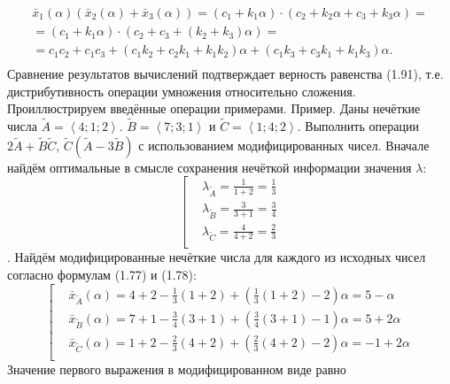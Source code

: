\[\begin{matrix}
  {{{\bar{x}}}_{1}}\left( \alpha  \right)\left( {{{\bar{x}}}_{2}}\left( \alpha  \right)+{{{\bar{x}}}_{3}}\left( \alpha  \right) \right)=({{c}_{1}}+{{k}_{1}}\alpha )\cdot ({{c}_{2}}+{{k}_{2}}\alpha +{{c}_{3}}+{{k}_{3}}\alpha )= \\ 
  =({{c}_{1}}+{{k}_{1}}\alpha )\cdot ({{c}_{2}}+{{c}_{3}}+({{k}_{2}}+{{k}_{3}})\alpha )= \\ 
  ={{c}_{1}}{{c}_{2}}+{{c}_{1}}{{c}_{3}}+({{c}_{1}}{{k}_{2}}+{{c}_{2}}{{k}_{1}}+{{k}_{1}}{{k}_{2}})\alpha +({{c}_{1}}{{k}_{3}}+{{c}_{3}}{{k}_{1}}+{{k}_{1}}{{k}_{3}})\alpha . \\ 
\end{matrix}\] 
Сравнение результатов вычислений подтверждает верность равенства (1.91), т.е. дистрибутивность операции умножения относительно сложения.
Проиллюстрируем введённые операции примерами.
Пример. Даны нечёткие числа $\tilde{A}=\left\langle 4;1;2 \right\rangle $. $\tilde{B}=\left\langle 7;3;1 \right\rangle $ и $\tilde{C}=\left\langle 1;4;2 \right\rangle $. Выполнить операции $2\tilde{A}+\tilde{B}\tilde{C}$, $\tilde{C}\left( \tilde{A}-3\tilde{B} \right)$ с использованием модифицированных чисел.
Вначале найдём оптимальные в смысле сохранения нечёткой информации значения $\lambda$:
	\[\left[ \begin{aligned}
  & {{\lambda }_{{\tilde{A}}}}=\frac{1}{1+2}=\frac{1}{3} \\ 
 & {{\lambda }_{{\tilde{B}}}}=\frac{3}{3+1}=\frac{3}{4} \\ 
 & {{\lambda }_{{\tilde{C}}}}=\frac{4}{4+2}=\frac{2}{3} \\ 
\end{aligned} \right.\].
Найдём модифицированные нечёткие числа для каждого из исходных чисел согласно формулам (1.77) и (1.78):
	\[\left[ \begin{aligned}
  & {{{\bar{x}}}_{{\tilde{A}}}}\left( \alpha  \right)=4+2-\frac{1}{3}\left( 1+2 \right)+\left( \frac{1}{3}\left( 1+2 \right)-2 \right)\alpha =5-\alpha  \\ 
 & {{{\bar{x}}}_{{\tilde{B}}}}\left( \alpha  \right)=7+1-\frac{3}{4}\left( 3+1 \right)+\left( \frac{3}{4}\left( 3+1 \right)-1 \right)\alpha =5+2\alpha  \\ 
 & {{{\bar{x}}}_{{\tilde{C}}}}\left( \alpha  \right)=1+2-\frac{2}{3}\left( 4+2 \right)+\left( \frac{2}{3}\left( 4+2 \right)-2 \right)\alpha =-1+2\alpha  \\ 
\end{aligned} \right.\] 
Значение первого выражения в модифицированном виде равно
